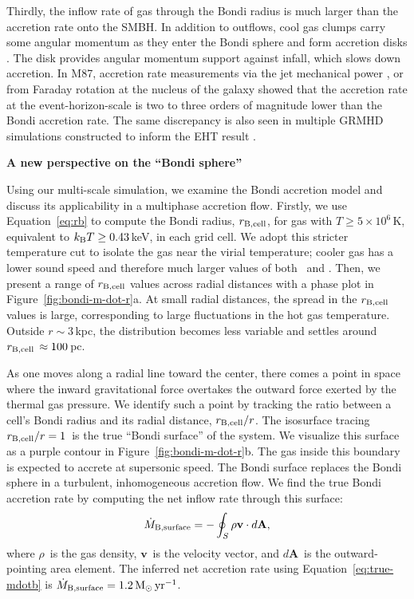 Thirdly, the inflow rate of gas through the Bondi radius is much larger than the accretion rate onto the SMBH\@. In addition to outflows, cool gas clumps carry some angular momentum as they enter the Bondi sphere and form accretion disks \citep[e.g.,][]{walsh_m87_2013,hsieh_circumnuclear_2021}. The disk provides angular momentum support against infall, which slows down accretion. In M87, accretion rate measurements via the jet mechanical power \citep[][]{broderick_event_2015}, or from Faraday rotation at the nucleus of the galaxy \citep[][]{kuo_measuring_2014} showed that the accretion rate at the event-horizon-scale is two to three orders of magnitude lower than the Bondi accretion rate. The same discrepancy is also seen in multiple GRMHD simulations constructed to inform the EHT result \citep[][]{eht_eight}.


\centerline{\textbf{A new perspective on the ``Bondi sphere''}}

Using our multi-scale simulation, we examine the Bondi accretion model and discuss its applicability in a multiphase accretion flow.
Firstly, we use Equation~\ref{eq:rb} to compute the Bondi radius, $r_{\rm B,cell}$, for gas with $T \geq 5\times10^6\,\mathrm{K}$, equivalent to $k_{\rm B}T \geq 0.43$\,keV, in each grid cell.
We adopt this stricter temperature cut to isolate the gas near the virial temperature; cooler gas has a lower sound speed and therefore much larger values of both \rb\ and \mdotb.
Then, we present a range of $r_{\rm B,cell}$ values across radial distances with a phase plot in Figure~\ref{fig:bondi-m-dot-r}a.
At small radial distances, the spread in the $r_{\rm B,cell}$ values is large, corresponding to large fluctuations in the hot gas temperature.
Outside $r \sim 3$\,kpc, the distribution becomes less variable and settles around $r_{\rm B,cell}\,\approx 100$\,pc.

As one moves along a radial line toward the center, there comes a point in space where the inward gravitational force overtakes the outward force exerted by the thermal gas pressure.
We identify such a point by tracking the ratio between a cell's Bondi radius and its radial distance, $r_{\rm B,cell}/r$. The isosurface tracing $r_{\rm B,cell}/r = 1$\ is the true ``Bondi surface'' of the system.
We visualize this surface as a purple contour in Figure~\ref{fig:bondi-m-dot-r}b. The gas inside this boundary is expected to accrete at supersonic speed.
The Bondi surface replaces the Bondi sphere in a turbulent, inhomogeneous accretion flow.
We find the true Bondi accretion rate by computing the net inflow rate through this surface:
\begin{equation}\label{eq:true-mdotb}
    \dot{M}_{\rm B,surface} = -\oint_S \rho \mathbf{v}\cdot d\mathbf{A},
\end{equation}
where $\rho$\ is the gas density, $\mathbf{v}$\ is the velocity vector, and $d\mathbf{A}$\ is the outward-pointing area element. The inferred net accretion rate using Equation~\ref{eq:true-mdotb} is $\dot{M}_{\rm B,surface} = 1.2\,\mathrm{M_{\odot}\,yr^{-1}}$.


